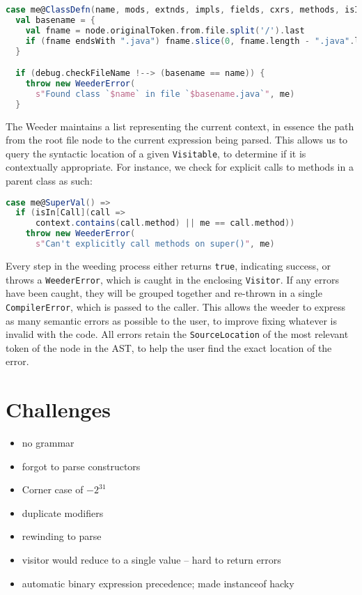 \documentclass{article}
\begin{document}
\begin{lstlisting}[language=Scala]
case me@ClassDefn(name, mods, extnds, impls, fields, cxrs, methods, isInterface) =>
  val basename = {
    val fname = node.originalToken.from.file.split('/').last
    if (fname endsWith ".java") fname.slice(0, fname.length - ".java".length) else ""
  }

  if (debug.checkFileName !--> (basename == name)) {
    throw new WeederError(
      s"Found class `$name` in file `$basename.java`", me)
  }
\end{lstlisting}
The Weeder maintains a list representing the current context, in essence the path from
the root file node to the current expression being parsed. This allows us to query the syntactic
location of a given {\tt Visitable}, to determine if it is contextually appropriate. For instance,
we check for explicit calls to methods in a parent class as such:

\begin{lstlisting}[language=Scala]
case me@SuperVal() =>
  if (isIn[Call](call =>
      context.contains(call.method) || me == call.method))
    throw new WeederError(
      s"Can't explicitly call methods on super()", me)
\end{lstlisting}

Every step in the weeding process either returns {\tt true}, indicating success,
or throws a {\tt WeederError}, which is caught in the enclosing {\tt Visitor}. If any
errors have been caught, they will be grouped together and re-thrown in a single 
{\tt CompilerError}, which is passed to the caller. This allows the weeder to express
as many semantic errors as possible to the user, to improve fixing whatever is invalid
with the code. All errors retain the {\tt SourceLocation} of the most relevant token of the
node in the AST, to help the user find the exact location of the error.
\section{Challenges}

\begin{itemize}
    \item no grammar
    \item forgot to parse constructors
    \item Corner case of $-2^{31}$
    \item duplicate modifiers
    \item rewinding to parse
    \item visitor would reduce to a single value -- hard to return errors
    \item automatic binary expression precedence; made instanceof hacky
\end{itemize}
\end{document}
